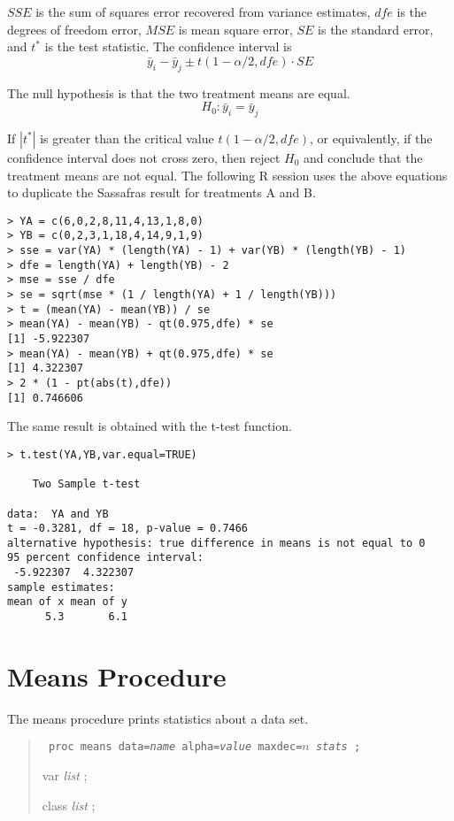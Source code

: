 \documentclass[12pt]{article}
\begin{document}
$SSE$ is the sum of squares error recovered from
variance estimates, $dfe$ is the degrees of freedom error, $MSE$
is mean square error, $SE$ is the standard error, and $t^*$ is the
test statistic.
The confidence interval is
\[
\bar y_i-\bar y_j\pm t(1-\alpha/2,dfe)\cdot SE
\]

The null hypothesis is that the two treatment means are equal.
\[
H_0:\bar y_i=\bar y_j
\]

If $|t^*|$ is greater than the critical value $t(1-\alpha/2,dfe)$,
or equivalently, if the confidence interval does not cross zero,
then reject $H_0$ and conclude that the treatment means are not equal.
The following R session uses the above equations
to duplicate the Sassafras result for
treatments A and B.

{\scriptsize\begin{verbatim}
> YA = c(6,0,2,8,11,4,13,1,8,0)
> YB = c(0,2,3,1,18,4,14,9,1,9)
> sse = var(YA) * (length(YA) - 1) + var(YB) * (length(YB) - 1)
> dfe = length(YA) + length(YB) - 2
> mse = sse / dfe
> se = sqrt(mse * (1 / length(YA) + 1 / length(YB)))
> t = (mean(YA) - mean(YB)) / se
> mean(YA) - mean(YB) - qt(0.975,dfe) * se
[1] -5.922307
> mean(YA) - mean(YB) + qt(0.975,dfe) * se
[1] 4.322307
> 2 * (1 - pt(abs(t),dfe))
[1] 0.746606
\end{verbatim}}

The same result is obtained with the t-test function.

{\scriptsize\begin{verbatim}
> t.test(YA,YB,var.equal=TRUE)

	Two Sample t-test

data:  YA and YB
t = -0.3281, df = 18, p-value = 0.7466
alternative hypothesis: true difference in means is not equal to 0
95 percent confidence interval:
 -5.922307  4.322307
sample estimates:
mean of x mean of y 
      5.3       6.1 
\end{verbatim}}

\newpage

\section{Means Procedure}

The means procedure prints statistics about a data set.

\begin{quote}
{\tt
proc means data={\it name} alpha={\it value} maxdec=$n$ {\it stats} ;

var {\it list} ;

class {\it list} ;
}
\end{quote}
\end{document}
